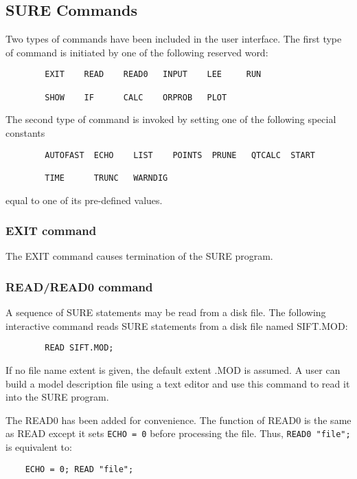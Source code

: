 \subsection{SURE Commands }

Two types of commands have been included in the user interface.  The first
type of command is initiated by one of the following reserved word:
\begin{verbatim}
        EXIT    READ    READ0   INPUT    LEE     RUN     

        SHOW    IF      CALC    ORPROB   PLOT
\end{verbatim}
  The second type of command is invoked by setting one of the following
  special constants
\begin{verbatim}
        AUTOFAST  ECHO    LIST    POINTS  PRUNE   QTCALC  START

        TIME      TRUNC   WARNDIG
\end{verbatim}
equal to one of its pre-defined values.

\subsubsection{EXIT command} The EXIT command causes termination of the
 SURE program.

\subsubsection{READ/READ0 command} A sequence of SURE statements may be read
 from a disk file. The following interactive command reads SURE statements
 from a disk file named {\isf SIFT.MOD}:
\begin{verbatim}
        READ SIFT.MOD;
\end{verbatim}
If no file name extent is given, the default extent {\isf .MOD} is assumed.  A
user can build a model description file using a text editor and use this
command to read it into the SURE program.

The {\isf READ0} has been added for convenience.  The function of {\isf READ0}
is the same as {\isf READ} except it sets \verb|ECHO = 0| before processing
the file.  Thus,
\verb|READ0 "file";| is equivalent to:
\begin{verbatim}  
    ECHO = 0; READ "file";
\end{verbatim} 

